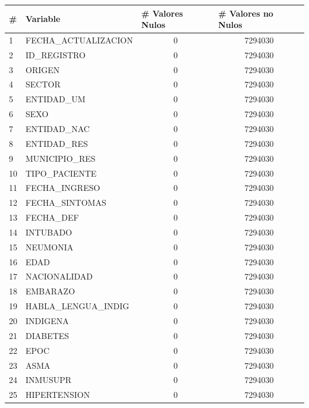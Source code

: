 \begin{table}[h]
\resizebox{10cm}{!} {
\begin{tabular}{|l|l|c|c|}
\hline
\# & Variable & \multicolumn{1}{l|}{\# Valores Nulos} & \multicolumn{1}{l|}{\# Valores no Nulos} \\ \hline
1  & FECHA\_ACTUALIZACION    & 0 & 7294030 \\ \hline
2  & ID\_REGISTRO            & 0 & 7294030 \\ \hline
3  & ORIGEN                  & 0 & 7294030 \\ \hline
4  & SECTOR                  & 0 & 7294030 \\ \hline
5  & ENTIDAD\_UM             & 0 & 7294030 \\ \hline
6  & SEXO                    & 0 & 7294030 \\ \hline
7  & ENTIDAD\_NAC            & 0 & 7294030 \\ \hline
8  & ENTIDAD\_RES            & 0 & 7294030 \\ \hline
9  & MUNICIPIO\_RES          & 0 & 7294030 \\ \hline
10 & TIPO\_PACIENTE          & 0 & 7294030 \\ \hline
11 & FECHA\_INGRESO          & 0 & 7294030 \\ \hline
12 & FECHA\_SINTOMAS         & 0 & 7294030 \\ \hline
13 & FECHA\_DEF              & 0 & 7294030 \\ \hline
14 & INTUBADO                & 0 & 7294030 \\ \hline
15 & NEUMONIA                & 0 & 7294030 \\ \hline
16 & EDAD                    & 0 & 7294030 \\ \hline
17 & NACIONALIDAD            & 0 & 7294030 \\ \hline
18 & EMBARAZO                & 0 & 7294030 \\ \hline
19 & HABLA\_LENGUA\_INDIG    & 0 & 7294030 \\ \hline
20 & INDIGENA                & 0 & 7294030 \\ \hline
21 & DIABETES                & 0 & 7294030 \\ \hline
22 & EPOC                    & 0 & 7294030 \\ \hline
23 & ASMA                    & 0 & 7294030 \\ \hline
24 & INMUSUPR                & 0 & 7294030 \\ \hline
25 & HIPERTENSION            & 0 & 7294030 \\ \hline

\end{tabular}}
\end{table}
